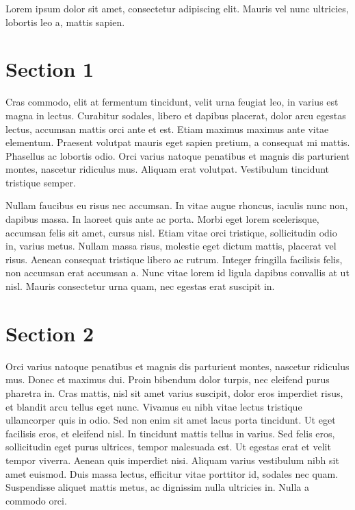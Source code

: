 
Lorem ipsum dolor sit amet, consectetur adipiscing elit. Mauris vel nunc ultricies, lobortis leo a, mattis sapien.

\section{Section 1}\label{sec:section-1-2}

Cras commodo, elit at fermentum tincidunt, velit urna feugiat leo, in varius est magna in lectus. Curabitur sodales, libero et dapibus placerat, dolor arcu egestas lectus, accumsan mattis orci ante et est. Etiam maximus maximus ante vitae elementum. Praesent volutpat mauris eget sapien pretium, a consequat mi mattis. Phasellus ac lobortis odio. Orci varius natoque penatibus et magnis dis parturient montes, nascetur ridiculus mus. Aliquam erat volutpat. Vestibulum tincidunt tristique semper.

Nullam faucibus eu risus nec accumsan. In vitae augue rhoncus, iaculis nunc non, dapibus massa. In laoreet quis ante ac porta. Morbi eget lorem scelerisque, accumsan felis sit amet, cursus nisl. Etiam vitae orci tristique, sollicitudin odio in, varius metus. Nullam massa risus, molestie eget dictum mattis, placerat vel risus. Aenean consequat tristique libero ac rutrum. Integer fringilla facilisis felis, non accumsan erat accumsan a. Nunc vitae lorem id ligula dapibus convallis at ut nisl. Mauris consectetur urna quam, nec egestas erat suscipit in.

\section{Section 2}\label{sec:section-2-2}

Orci varius natoque penatibus et magnis dis parturient montes, nascetur ridiculus mus. Donec et maximus dui. Proin bibendum dolor turpis, nec eleifend purus pharetra in. Cras mattis, nisl sit amet varius suscipit, dolor eros imperdiet risus, et blandit arcu tellus eget nunc. Vivamus eu nibh vitae lectus tristique ullamcorper quis in odio. Sed non enim sit amet lacus porta tincidunt. Ut eget facilisis eros, et eleifend nisl. In tincidunt mattis tellus in varius. Sed felis eros, sollicitudin eget purus ultrices, tempor malesuada est. Ut egestas erat et velit tempor viverra. Aenean quis imperdiet nisi. Aliquam varius vestibulum nibh sit amet euismod. Duis massa lectus, efficitur vitae porttitor id, sodales nec quam. Suspendisse aliquet mattis metus, ac dignissim nulla ultricies in. Nulla a commodo orci.

